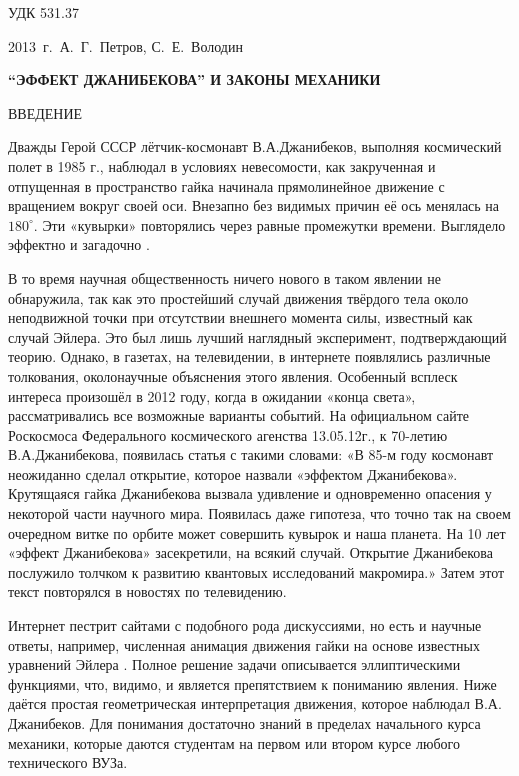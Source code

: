 \documentclass[14pt,a4paper]{extarticle}
\begin{document}
УДК 531.37

\smallskip


\centerline{2013~г.~{А.~Г.~Петров, С.~Е.~Володин}}

\smallskip

\centerline{\bf ``ЭФФЕКТ ДЖАНИБЕКОВА'' И ЗАКОНЫ МЕХАНИКИ}

\bigskip

ВВЕДЕНИЕ

 Дважды Герой СССР лётчик-космонавт В.А.Джанибеков, выполняя космический полет в 1985 г., наблюдал в условиях невесомости, как
закрученная и отпущенная в пространство гайка начинала прямолинейное движение с вращением вокруг
своей оси. Внезапно без видимых причин её ось менялась на $180^\circ$. Эти «кувырки» повторялись через
равные промежутки времени. Выглядело эффектно и загадочно \cite{video}.

В то время научная общественность ничего нового в таком явлении не обнаружила, так как это простейший случай движения твёрдого тела около неподвижной точки при отсутствии внешнего момента силы, известный как случай Эйлера. Это был лишь лучший наглядный эксперимент, подтверждающий теорию.
Однако, в газетах, на телевидении, в интернете появлялись различные толкования, околонаучные объяснения этого явления.
Особенный всплеск интереса произошёл в 2012 году, когда в ожидании «конца света», рассматривались все возможные варианты событий. На официальном сайте Роскосмоса Федерального космического агенства 13.05.12г., к 70-летию В.А.Джанибекова,  появилась статья \cite{federalspace} с такими словами: «В 85-м году космонавт неожиданно сделал открытие, которое назвали «эффектом Джанибекова». Крутящаяся гайка Джанибекова вызвала удивление и одновременно опасения у некоторой части научного мира. Появилась даже гипотеза, что точно так на своем очередном витке по орбите может совершить кувырок и наша планета. На 10 лет «эффект Джанибекова» засекретили, на всякий случай. Открытие Джанибекова послужило толчком к развитию квантовых исследований макромира.» Затем этот текст повторялся в новостях по телевидению.

Интернет пестрит сайтами с подобного рода дискуссиями, но есть и научные ответы, например, численная анимация движения гайки на основе известных уравнений Эйлера
\cite{anim}. Полное решение задачи описывается эллиптическими функциями, что, видимо, и является препятствием к пониманию явления.
Ниже даётся простая геометрическая интерпретация движения, которое наблюдал В.А. Джанибеков. Для понимания достаточно  знаний в пределах начального курса механики, которые даются студентам на первом или втором курсе любого технического ВУЗа.
\end{document}
